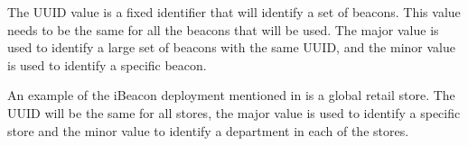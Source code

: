 The UUID value is a fixed identifier that will identify a set of beacons.
This value needs to be the same for all the beacons that will be used.
The major value is used to identify a large set of beacons with the same UUID, and the minor value is used to identify a specific beacon.
\cite{GettingStartedIBeacon2014}

\bigskip

An example of the iBeacon deployment mentioned in \cite{GettingStartedIBeacon2014} is a global retail store. The UUID will be the same for all stores, the major value is used to identify a specific store and the minor value to identify a department in each of the stores.
\cite{GettingStartedIBeacon2014} 

